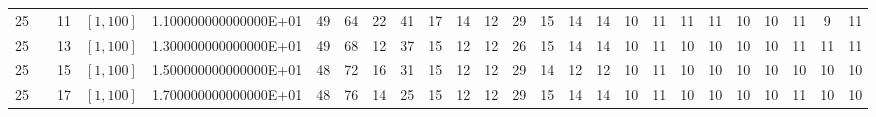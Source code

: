 \documentclass{article}
\begin{document}
\begin{landscape}
\begin{longtable}{ccccccccccccccccccccccccc}
  25 &  & 11         & $[1,100]$ & 1.100000000000000E+01 & \cellcolor{red!5} 49        &\cellcolor{red!75} 64        &\cellcolor{red!5} 22        &\cellcolor{red!5} 41        &17        &\cellcolor{green!5} 14        &\cellcolor{green!5} 12        &\cellcolor{red!5} 29        &15        &\cellcolor{green!5} 14        &\cellcolor{green!5} 14        &\cellcolor{green!5} 10        &\cellcolor{green!5} 11        &\cellcolor{green!5} 11        &\cellcolor{green!5} 11        &\cellcolor{green!5} 10        &\cellcolor{green!5} 10        &\cellcolor{green!5} 11        &\cellcolor{green!75} 9         &\cellcolor{green!5} 11\\
  25 &  & 13         & $[1,100]$ & 1.300000000000000E+01 & \cellcolor{red!5} 49        &\cellcolor{red!75} 68        &\cellcolor{green!5} 12        &\cellcolor{red!5} 37        &\cellcolor{green!5} 15        &\cellcolor{green!5} 12        &\cellcolor{green!5} 12        &\cellcolor{red!5} 26        &\cellcolor{green!5} 15        &\cellcolor{green!5} 14        &\cellcolor{green!5} 14        &\cellcolor{green!25} 10        &\cellcolor{green!5} 11        &\cellcolor{green!25} 10        &\cellcolor{green!25} 10        &\cellcolor{green!25} 10        &\cellcolor{green!25} 10        &\cellcolor{green!5} 11        &\cellcolor{green!5} 11        &\cellcolor{green!5} 11\\
  25 &  & 15         & $[1,100]$ & 1.500000000000000E+01 & \cellcolor{red!5} 48        &\cellcolor{red!75} 72        &16        &\cellcolor{red!5} 31        &\cellcolor{green!5} 15        &\cellcolor{green!5} 12        &\cellcolor{green!5} 12        &\cellcolor{red!5} 29        &\cellcolor{green!5} 14        &\cellcolor{green!5} 12        &\cellcolor{green!5} 12        &\cellcolor{green!25} 10        &\cellcolor{green!5} 11        &\cellcolor{green!25} 10        &\cellcolor{green!25} 10        &\cellcolor{green!25} 10        &\cellcolor{green!25} 10        &\cellcolor{green!25} 10        &\cellcolor{green!25} 10        &\cellcolor{green!25} 10\\
  25 &  & 17         & $[1,100]$ & 1.700000000000000E+01 & \cellcolor{red!5} 48        &\cellcolor{red!75} 76        &\cellcolor{green!5} 14        &\cellcolor{red!5} 25        &\cellcolor{green!5} 15        &\cellcolor{green!5} 12        &\cellcolor{green!5} 12        &\cellcolor{red!5} 29        &\cellcolor{green!5} 15        &\cellcolor{green!5} 14        &\cellcolor{green!5} 14        &\cellcolor{green!25} 10        &\cellcolor{green!5} 11        &\cellcolor{green!25} 10        &\cellcolor{green!25} 10        &\cellcolor{green!25} 10        &\cellcolor{green!25} 10        &\cellcolor{green!5} 11        &\cellcolor{green!25} 10        &\cellcolor{green!25} 10\\

\end{longtable}
\end{landscape}
\end{document}
